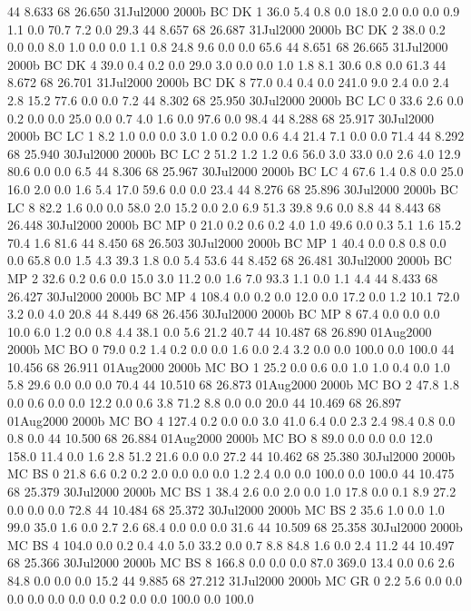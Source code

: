 44 8.633	68 26.650	31Jul2000	2000b	BC	DK	1	36.0	5.4	0.8	0.0	18.0	2.0	0.0	0.0	0.9	1.1	0.0	70.7	7.2	0.0	29.3
44 8.657	68 26.687	31Jul2000	2000b	BC	DK	2	38.0	0.2	0.0	0.0	8.0	1.0	0.0	0.0	1.1	0.8	24.8	9.6	0.0	0.0	65.6
44 8.651	68 26.665	31Jul2000	2000b	BC	DK	4	39.0	0.4	0.2	0.0	29.0	3.0	0.0	0.0	1.0	1.8	8.1	30.6	0.8	0.0	61.3
44 8.672	68 26.701	31Jul2000	2000b	BC	DK	8	77.0	0.4	0.4	0.0	241.0	9.0	2.4	0.0	2.4	2.8	15.2	77.6	0.0	0.0	7.2
44 8.302	68 25.950	30Jul2000	2000b	BC	LC	0	33.6	2.6	0.0	0.2	0.0	0.0	25.0	0.0	0.7	4.0	1.6	0.0	97.6	0.0	98.4
44 8.288	68 25.917	30Jul2000	2000b	BC	LC	1	8.2	1.0	0.0	0.0	3.0	1.0	0.2	0.0	0.6	4.4	21.4	7.1	0.0	0.0	71.4
44 8.292	68 25.940	30Jul2000	2000b	BC	LC	2	51.2	1.2	1.2	0.6	56.0	3.0	33.0	0.0	2.6	4.0	12.9	80.6	0.0	0.0	6.5
44 8.306	68 25.967	30Jul2000	2000b	BC	LC	4	67.6	1.4	0.8	0.0	25.0	16.0	2.0	0.0	1.6	5.4	17.0	59.6	0.0	0.0	23.4
44 8.276	68 25.896	30Jul2000	2000b	BC	LC	8	82.2	1.6	0.0	0.0	58.0	2.0	15.2	0.0	2.0	6.9	51.3	39.8	9.6	0.0	8.8
44 8.443	68 26.448	30Jul2000	2000b	BC	MP	0	21.0	0.2	0.6	0.2	4.0	1.0	49.6	0.0	0.3	5.1	1.6	15.2	70.4	1.6	81.6
44 8.450	68 26.503	30Jul2000	2000b	BC	MP	1	40.4	0.0	0.8	0.8	0.0	0.0	65.8	0.0	1.5	4.3	39.3	1.8	0.0	5.4	53.6
44 8.452	68 26.481	30Jul2000	2000b	BC	MP	2	32.6	0.2	0.6	0.0	15.0	3.0	11.2	0.0	1.6	7.0	93.3	1.1	0.0	1.1	4.4
44 8.433	68 26.427	30Jul2000	2000b	BC	MP	4	108.4	0.0	0.2	0.0	12.0	0.0	17.2	0.0	1.2	10.1	72.0	3.2	0.0	4.0	20.8
44 8.449	68 26.456	30Jul2000	2000b	BC	MP	8	67.4	0.0	0.0	0.0	10.0	6.0	1.2	0.0	0.8	4.4	38.1	0.0	5.6	21.2	40.7
44 10.487	68 26.890	01Aug2000	2000b	MC	BO	0	79.0	0.2	1.4	0.2	0.0	0.0	1.6	0.0	2.4	3.2	0.0	0.0	100.0	0.0	100.0
44 10.456	68 26.911	01Aug2000	2000b	MC	BO	1	25.2	0.0	0.6	0.0	1.0	1.0	0.4	0.0	1.0	5.8	29.6	0.0	0.0	0.0	70.4
44 10.510	68 26.873	01Aug2000	2000b	MC	BO	2	47.8	1.8	0.0	0.6	0.0	0.0	12.2	0.0	0.6	3.8	71.2	8.8	0.0	0.0	20.0
44 10.469	68 26.897	01Aug2000	2000b	MC	BO	4	127.4	0.2	0.0	0.0	3.0	41.0	6.4	0.0	2.3	2.4	98.4	0.8	0.0	0.8	0.0
44 10.500	68 26.884	01Aug2000	2000b	MC	BO	8	89.0	0.0	0.0	0.0	12.0	158.0	11.4	0.0	1.6	2.8	51.2	21.6	0.0	0.0	27.2
44 10.462	68 25.380	30Jul2000	2000b	MC	BS	0	21.8	6.6	0.2	0.2	2.0	0.0	0.0	0.0	1.2	2.4	0.0	0.0	100.0	0.0	100.0
44 10.475	68 25.379	30Jul2000	2000b	MC	BS	1	38.4	2.6	0.0	2.0	0.0	1.0	17.8	0.0	0.1	8.9	27.2	0.0	0.0	0.0	72.8
44 10.484	68 25.372	30Jul2000	2000b	MC	BS	2	35.6	1.0	0.0	1.0	99.0	35.0	1.6	0.0	2.7	2.6	68.4	0.0	0.0	0.0	31.6
44 10.509	68 25.358	30Jul2000	2000b	MC	BS	4	104.0	0.0	0.2	0.4	4.0	5.0	33.2	0.0	0.7	8.8	84.8	1.6	0.0	2.4	11.2
44 10.497	68 25.366	30Jul2000	2000b	MC	BS	8	166.8	0.0	0.0	0.0	87.0	369.0	13.4	0.0	0.6	2.6	84.8	0.0	0.0	0.0	15.2
44 9.885	68 27.212	31Jul2000	2000b	MC	GR	0	2.2	5.6	0.0	0.0	0.0	0.0	0.0	0.0	0.0	0.2	0.0	0.0	100.0	0.0	100.0
